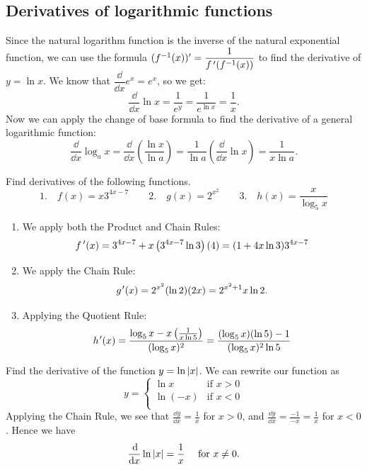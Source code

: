 \subsection{Derivatives of logarithmic functions}

Since the natural logarithm function is the inverse of the natural exponential function, we can use the formula $(f^{-1}(x))'=\dfrac1{f\,'(f^{-1}(x))}$ to find the derivative of $y=\ln x$. We know that $\dfrac\dd{\dd x}e^x=e^x$, so we get:
\[\frac\dd{\dd x}\ln x=\frac1{e^y}=\frac1{e^{\ln x}}=\frac1x.\]
Now we
can apply the change of base formula to find the derivative of a general logarithmic function:
\[\frac{\dd}{\dd x}\log_ax=\frac{\dd}{\dd x}\left(\frac{\ln x}{\ln a}\right) =\frac 1{\ln a}\left(\frac{\dd}{\dd x}\ln x\right)=\frac 1{x\ln a}.\]

\begin{example}\label{ex_find_d_exp_log}%
Find derivatives of the following functions.
\[
 \text{1.}\quad f(x)=x3^{4x-7}\qquad
 \text{2.}\quad g(x)=2^{x^2}\qquad
 \text{3.}\quad h(x)=\frac x{\log_5x}
\]
\solution
\begin{enumerate}
\item We apply both the Product and Chain Rules:
\[f\,'(x)=3^{4x-7}+x\left(3^{4x-7}\ln 3\right)(4)=(1+4x\ln 3)3^{4x-7}\]
\item We apply the Chain Rule:
\[g\primeskip'(x)=2^{x^2}(\ln 2)(2x)=2^{x^2+1}x\ln2.\]
\item Applying the Quotient Rule:
\[h\primeskip'(x)=\frac{\log_5x-x\left(\frac1{x\ln 5}\right)}{(\log_5x)^2}=\frac{(\log_5x)(\ln 5)-1}{(\log_5x)^2\ln 5}\]
\end{enumerate}
\end{example}

\begin{example}\label{ex_d_ln_abs_x}%
Find the derivative of the function $y=\ln\left\lvert x \right\rvert$.
\solution
We can rewrite our function as
\[y=\begin{cases} \ln x & \text{if $x>0$}\\ \ln(-x) & \text{if $x<0$}\\ \end{cases}\]
Applying the Chain Rule, we see that $\frac{\dd y}{\dd x}=\frac 1x$ for $x>0$, and $\frac{\dd y}{\dd x}=\frac{-1}{-x}=\frac 1x$ for $x<0$. Hence we have
\[\frac{\operatorname{d}\!}{\operatorname{d}\! x}\ln\left\lvert x \right\rvert=\frac 1x \quad\text{ for $x\neq0$.}\]
\end{example}

